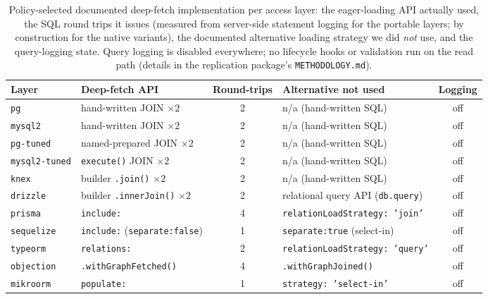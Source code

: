 \begin{table}[htbp]
  \centering
  \caption{Policy-selected documented deep-fetch implementation per access layer: the eager-loading
    API actually used, the SQL round trips it issues (measured from server-side
    statement logging for the portable layers; by construction for the native
    variants), the documented alternative loading strategy we did \emph{not} use,
    and the query-logging state. Query logging is disabled everywhere; no lifecycle
    hooks or validation run on the read path (details in the replication package's
    \texttt{METHODOLOGY.md}).}
  \label{tab:adapter_choices}
  \begin{adjustbox}{max width=\textwidth}
  \begin{tabular}{l l c l c}
    \toprule
    Layer & Deep-fetch API & Round-trips & Alternative not used & Logging \\
    \midrule
    \texttt{pg}           & hand-written JOIN $\times 2$        & 2 & n/a (hand-written SQL)                 & off \\
    \texttt{mysql2}       & hand-written JOIN $\times 2$        & 2 & n/a (hand-written SQL)                 & off \\
    \texttt{pg-tuned}     & named-prepared JOIN $\times 2$      & 2 & n/a (hand-written SQL)                 & off \\
    \texttt{mysql2-tuned} & \texttt{execute()} JOIN $\times 2$  & 2 & n/a (hand-written SQL)                 & off \\
    \texttt{knex}         & builder \texttt{.join()} $\times 2$ & 2 & n/a (hand-written SQL)                 & off \\
    \texttt{drizzle}      & builder \texttt{.innerJoin()} $\times 2$ & 2 & relational query API (\texttt{db.query}) & off \\
    \texttt{prisma}       & \texttt{include:}                   & 4 & \texttt{relationLoadStrategy:\,'join'} & off \\
    \texttt{sequelize}    & \texttt{include:} (\texttt{separate:false}) & 1 & \texttt{separate:true} (select-in)  & off \\
    \texttt{typeorm}      & \texttt{relations:}                 & 2 & \texttt{relationLoadStrategy:\,'query'} & off \\
    \texttt{objection}    & \texttt{.withGraphFetched()}        & 4 & \texttt{.withGraphJoined()}            & off \\
    \texttt{mikroorm}     & \texttt{populate:}                  & 1 & \texttt{strategy:\,'select-in'}        & off \\
    \bottomrule
  \end{tabular}
  \end{adjustbox}
\end{table}

